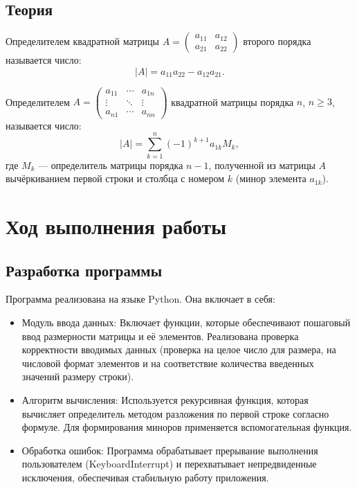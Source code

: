 \documentclass[14pt,a4paper]{extarticle}
\begin{document}
\subsection*{Теория}
Определителем квадратной матрицы $A = \begin{pmatrix} a_{11} & a_{12} \\ a_{21} & a_{22} \end{pmatrix}$ второго порядка называется число:
\begin{equation}
|A| = a_{11}a_{22} - a_{12}a_{21}.
\label{eq:det2}
\end{equation}

Определителем $A = \begin{pmatrix} a_{11} & \cdots & a_{1n} \\ \vdots & \ddots & \vdots \\ a_{n1} & \cdots & a_{nn} \end{pmatrix}$ квадратной матрицы порядка $n$, $n \geq 3$, называется число:
\begin{equation}
|A| = \sum_{k=1}^{n} (-1)^{k+1} a_{1k} M_k,
\label{eq:detn}
\end{equation}
где $M_k$ --- определитель матрицы порядка $n-1$, полученной из матрицы $A$ вычёркиванием первой строки и столбца с номером $k$ (минор элемента $a_{1k}$).

\section{Ход выполнения работы}

\subsection{Разработка программы}
Программа реализована на языке Python. Она включает в себя:
\begin{itemize}
    \item Модуль ввода данных: Включает функции, которые обеспечивают пошаговый ввод размерности матрицы и её элементов. Реализована проверка корректности вводимых данных (проверка на целое число для размера, на числовой формат элементов и на соответствие количества введенных значений размеру строки).
    \item Алгоритм вычисления: Используется рекурсивная функция, которая вычисляет определитель методом разложения по первой строке согласно формуле. Для формирования миноров применяется вспомогательная функция.
    \item Обработка ошибок: Программа обрабатывает прерывание выполнения пользователем (KeyboardInterrupt) и перехватывает непредвиденные исключения, обеспечивая стабильную работу приложения.
\end{itemize}
\end{document}
